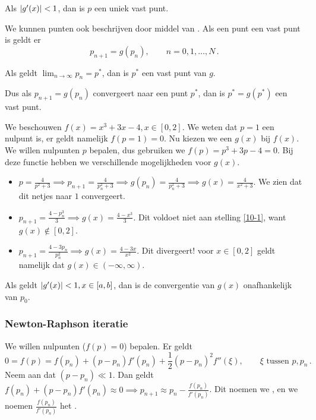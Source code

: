 \documentclass{2wn20summary}
\begin{document}
				\begin{theonum}\label{10-2}
					Als $ {\left|g'(x)\right|} < 1 $, dan is $p$ een uniek vast punt.
				\end{theonum}
				We kunnen punten ook beschrijven door middel van . Als een punt een vast punt is geldt er
				\[
					p_{n+1} = g(p_n), \qquad n=0,1,\dotsc,N\,.
				\]
				\begin{theorem}
					Als geldt $ \lim_{n \to \infty}p_n = p^* $, dan is $p^*$ een vast punt van $g$.
				\end{theorem}
				Dus als $ p_{n+1} = g(p_n) $ convergeert naar een punt $p^*$, dan is $ p^*=g(p^*) $ een vast punt.

				\begin{voorbeeld}
					We beschouwen $ f(x) = x^3 + 3x - 4, x \in [0,2] $. We weten dat $p=1$ een nulpunt is, er geldt namelijk $ f(p=1)=0 $. Nu kiezen we een $g(x)$ bij $f(x)$. We willen nulpunten $p$ bepalen, dus gebruiken we $ f(p) = p^3 + 3p - 4 = 0 $. Bij deze functie hebben we verschillende mogelijkheden voor $g(x)$.
					\begin{itemize}
						\item $ p = \frac{4}{p^2+3} \implies p_{n+1}=\frac{4}{p_n^2 + 3} \implies g(p_n) = \frac{4}{p_n^2 + 3} \implies g(x) = \frac{4}{x^2 + 3}$. We zien dat dit netjes naar $1$ convergeert.
						\item $ p_{n+1} = \frac{4-p_n^3}{3} \implies g(x) = \frac{4-x^3}{3} $. Dit voldoet niet aan stelling \ref{10-1}, want $ g(x) \not \in [0,2] $.
						\item $ p_{n+1} = \frac{4-3p_n}{p_n^2} \implies g(x) = \frac{4-3x}{x^2}$. Dit divergeert! voor $ x \in [0,2] $ geldt namelijk dat $ g(x) \in (-\infty,\infty) $.
					\end{itemize}
				\end{voorbeeld}

				\begin{theorem}
					Als geldt $ {\left|g'(x)\right|}< 1, x \in [a,b] $, dan is de convergentie van $g(x)$ onafhankelijk van $ p_0 $.
				\end{theorem}

			\subsubsection{Newton-Raphson iteratie}
				We willen nulpunten ($ f(p)=0 $) bepalen. Er geldt
				\[
					0 = f(p) = f(p_n) + (p-p_n)f'(p_n) + \frac{1}{2}(p-p_n)^2 f''(\xi), \qquad \xi \text { tussen } p,p_n\,.
				\]
				Neem aan dat $ (p-p_n) \ll 1$. Dan geldt $ f(p_n) + (p-p_n)f'(p_n) \approx 0 \implies p_{n+1} \approx p_n - \frac{f(p_n)}{f'(p_n)} $. Dit noemen we , en we noemen $ \frac{f(p_n)}{f'(p_n)} $ het .
\end{document}
